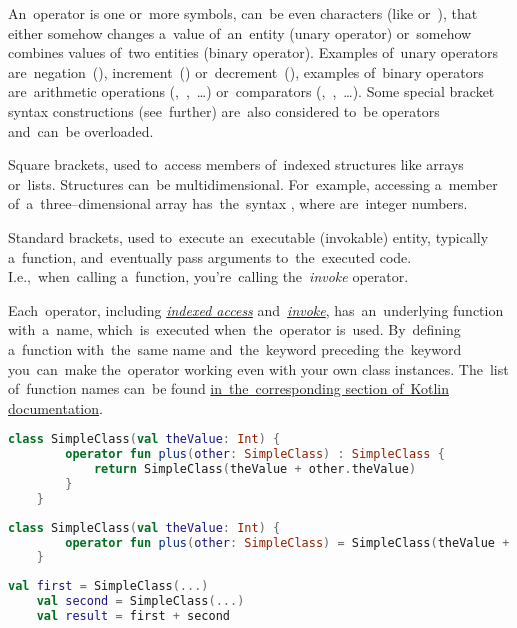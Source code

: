 An~operator is one or~more symbols, can~be even characters (like  \mbox{or }), that either somehow changes a~value of~an~entity (unary operator) or~somehow combines values of~two entities (binary operator).
Examples of~unary operators are~negation~(\itq{!}), increment~(\itq{++}) or~decrement~(\itq{-{}-}), examples of~binary operators are~arithmetic operations \mbox{(\itq{+}, \itq{-}, \dots)} or~comparators \mbox{(\itq{<}, \itq{>}, \dots)}.
Some special bracket syntax constructions (see~further) are~also considered to~be operators and~can~be overloaded.

\label{kotlinindexedaccess}
Square brackets, used to~access members of~indexed structures like arrays or~lists.
Structures can~be multidimensional.
For~example, accessing a~member of~a~three--dimensional array has~the~syntax \mbox{,} where  are~integer numbers.

\label{kotlininvoke}
Standard brackets, used to~execute an~executable (invokable) entity, typically a~function, and~eventually pass arguments to~the~executed code.
I.e.,~when~calling a~function, you're~calling the~\textit{invoke} operator.

\label{kotlinoperatoroverload}
Each~operator, including \hyperref[kotlinindexedaccess]{\textit{indexed access}} \mbox{and \hyperref[kotlininvoke]{\textit{invoke}},} has~an~underlying function with~a~name, which~is~executed when~the~operator is~used.
By~defining a~function with~the~same name and~the~keyword  preceding the~keyword you~can~make the~operator working even with your own class instances.
The~list of~function names can~be found \href{https://kotlinlang.org/docs/reference/operator-overloading.html}{in~the~corresponding section of~Kotlin documentation}.

\begin{lstlisting}[language=Kotlin, title={Custom class with the operator overloading}]
    class SimpleClass(val theValue: Int) {
        operator fun plus(other: SimpleClass) : SimpleClass {
            return SimpleClass(theValue + other.theValue)
        }
    }
\end{lstlisting}
\begin{lstlisting}[language=Kotlin, title={Equivalent with direct assignment simplification}]
    class SimpleClass(val theValue: Int) {
        operator fun plus(other: SimpleClass) = SimpleClass(theValue + other.theValue)
    }
\end{lstlisting}
\begin{lstlisting}[language=Kotlin, title={Usage}]
    val first = SimpleClass(...)
    val second = SimpleClass(...)
    val result = first + second
\end{lstlisting}
\newline


